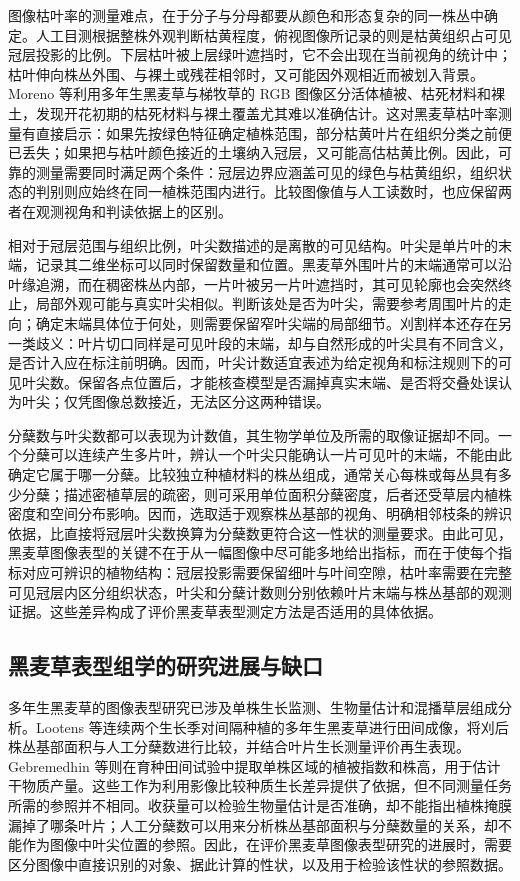 图像枯叶率的测量难点，在于分子与分母都要从颜色和形态复杂的同一株丛中确定。人工目测根据整株外观判断枯黄程度，俯视图像所记录的则是枯黄组织占可见冠层投影的比例。下层枯叶被上层绿叶遮挡时，它不会出现在当前视角的统计中；枯叶伸向株丛外围、与裸土或残茬相邻时，又可能因外观相近而被划入背景。Moreno 等利用多年生黑麦草与梯牧草的 RGB 图像区分活体植被、枯死材料和裸土，发现开花初期的枯死材料与裸土覆盖尤其难以准确估计。这对黑麦草枯叶率测量有直接启示：如果先按绿色特征确定植株范围，部分枯黄叶片在组织分类之前便已丢失；如果把与枯叶颜色接近的土壤纳入冠层，又可能高估枯黄比例。因此，可靠的测量需要同时满足两个条件：冠层边界应涵盖可见的绿色与枯黄组织，组织状态的判别则应始终在同一植株范围内进行。比较图像值与人工读数时，也应保留两者在观测视角和判读依据上的区别。

相对于冠层范围与组织比例，叶尖数描述的是离散的可见结构。叶尖是单片叶的末端，记录其二维坐标可以同时保留数量和位置。黑麦草外围叶片的末端通常可以沿叶缘追溯，而在稠密株丛内部，一片叶被另一片叶遮挡时，其可见轮廓也会突然终止，局部外观可能与真实叶尖相似。判断该处是否为叶尖，需要参考周围叶片的走向；确定末端具体位于何处，则需要保留窄叶尖端的局部细节。刈割样本还存在另一类歧义：叶片切口同样是可见叶段的末端，却与自然形成的叶尖具有不同含义，是否计入应在标注前明确。因而，叶尖计数适宜表述为给定视角和标注规则下的可见叶尖数。保留各点位置后，才能核查模型是否漏掉真实末端、是否将交叠处误认为叶尖；仅凭图像总数接近，无法区分这两种错误。

分蘖数与叶尖数都可以表现为计数值，其生物学单位及所需的取像证据却不同。一个分蘖可以连续产生多片叶，辨认一个叶尖只能确认一片可见叶的末端，不能由此确定它属于哪一分蘖。比较独立种植材料的株丛组成，通常关心每株或每丛具有多少分蘖；描述密植草层的疏密，则可采用单位面积分蘖密度，后者还受草层内植株密度和空间分布影响。因而，选取适于观察株丛基部的视角、明确相邻枝条的辨识依据，比直接将冠层叶尖数换算为分蘖数更符合这一性状的测量要求。由此可见，黑麦草图像表型的关键不在于从一幅图像中尽可能多地给出指标，而在于使每个指标对应可辨识的植物结构：冠层投影需要保留细叶与叶间空隙，枯叶率需要在完整可见冠层内区分组织状态，叶尖和分蘖计数则分别依赖叶片末端与株丛基部的观测证据。这些差异构成了评价黑麦草表型测定方法是否适用的具体依据。


\subsection{黑麦草表型组学的研究进展与缺口}
\label{sec:ryegrass-phenomics-gaps}

多年生黑麦草的图像表型研究已涉及单株生长监测、生物量估计和混播草层组成分析。Lootens 等连续两个生长季对间隔种植的多年生黑麦草进行田间成像，将刈后株丛基部面积与人工分蘖数进行比较，并结合叶片生长测量评价再生表现。Gebremedhin 等则在育种田间试验中提取单株区域的植被指数和株高，用于估计干物质产量。这些工作为利用影像比较种质生长差异提供了依据，但不同测量任务所需的参照并不相同。收获量可以检验生物量估计是否准确，却不能指出植株掩膜漏掉了哪条叶片；人工分蘖数可以用来分析株丛基部面积与分蘖数量的关系，却不能作为图像中叶尖位置的参照。因此，在评价黑麦草图像表型研究的进展时，需要区分图像中直接识别的对象、据此计算的性状，以及用于检验该性状的参照数据。

